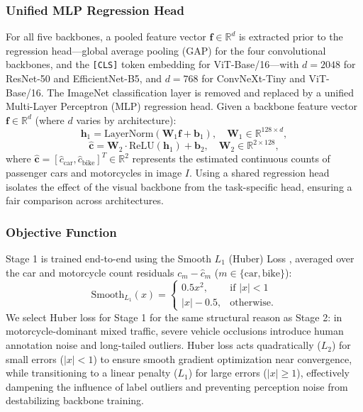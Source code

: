 \documentclass[a4paper,fleqn]{cas-sc}
\begin{document}
\subsubsection{Unified MLP Regression Head}
For all five backbones, a pooled feature vector $\mathbf{f} \in \mathbb{R}^{d}$ is extracted prior to the regression head---global average pooling (GAP) for the four convolutional backbones, and the \texttt{[CLS]} token embedding for ViT-Base/16---with $d = 2048$ for ResNet-50 and EfficientNet-B5, and $d = 768$ for ConvNeXt-Tiny and ViT-Base/16. The ImageNet classification layer is removed and replaced by a unified Multi-Layer Perceptron (MLP) regression head. Given a backbone feature vector $\mathbf{f} \in \mathbb{R}^{d}$ (where $d$ varies by architecture):
\begin{equation}
\mathbf{h}_1 = \text{LayerNorm}\left( \mathbf{W}_1 \mathbf{f} + \mathbf{b}_1 \right), \quad \mathbf{W}_1 \in \mathbb{R}^{128 \times d},
\end{equation}
\begin{equation}
\hat{\mathbf{c}} = \mathbf{W}_2 \cdot \text{ReLU}(\mathbf{h}_1) + \mathbf{b}_2, \quad \mathbf{W}_2 \in \mathbb{R}^{2 \times 128},
\end{equation}
where $\hat{\mathbf{c}} = [\hat{c}_{\text{car}}, \hat{c}_{\text{bike}}]^T \in \mathbb{R}^2$ represents the estimated continuous counts of passenger cars and motorcycles in image $I$. Using a shared regression head isolates the effect of the visual backbone from the task-specific head, ensuring a fair comparison across architectures.

\subsubsection{Objective Function}
Stage 1 is trained end-to-end using the Smooth $L_1$ (Huber) Loss \cite{huber}, averaged over the car and motorcycle count residuals $c_m - \hat{c}_m$ ($m \in \{\text{car}, \text{bike}\}$):
\begin{equation}
\text{Smooth}_{L_1}(x) = \begin{cases} 0.5 x^2, & \text{if } |x| < 1 \\ |x| - 0.5, & \text{otherwise.} \end{cases}
\end{equation}
We select Huber loss for Stage 1 for the same structural reason as Stage 2: in motorcycle-dominant mixed traffic, severe vehicle occlusions introduce human annotation noise and long-tailed outliers. Huber loss acts quadratically ($L_2$) for small errors ($|x| < 1$) to ensure smooth gradient optimization near convergence, while transitioning to a linear penalty ($L_1$) for large errors ($|x| \ge 1$), effectively dampening the influence of label outliers and preventing perception noise from destabilizing backbone training.
\end{document}
